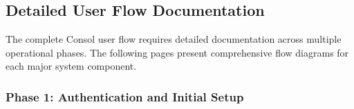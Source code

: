 
\clearpage
\subsection{Detailed User Flow Documentation}

The complete Consol user flow requires detailed documentation across multiple operational phases. The following pages present comprehensive flow diagrams for each major system component.

\subsubsection{Phase 1: Authentication and Initial Setup}

